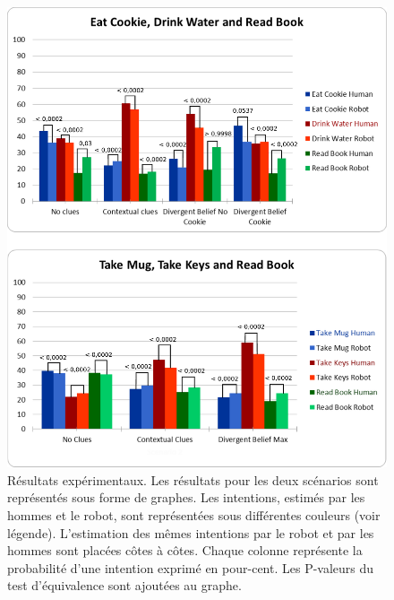 \documentclass[a4paper,11pt,twoside]{StyleThese}
\begin{document}
 \begin{figure}[h!]
	\centering
	\includegraphics[clip,scale=0.52]{img/pvalues1.pdf}
	\caption{Résultats expérimentaux. Les résultats pour les deux scénarios sont représentés sous forme de graphes. Les intentions, estimés par les hommes et le robot, sont représentées sous différentes couleurs (voir légende). L'estimation des mêmes intentions par le robot et par les hommes sont placées côtes à côtes. Chaque colonne représente la probabilité d'une intention exprimé en pour-cent. Les P-valeurs du test d'équivalence sont ajoutées au graphe.}
	\label{fig:user_study_results}
  	\vspace{-16pt}
\end{figure}


\ifdefined{}
\else


\end{document}
